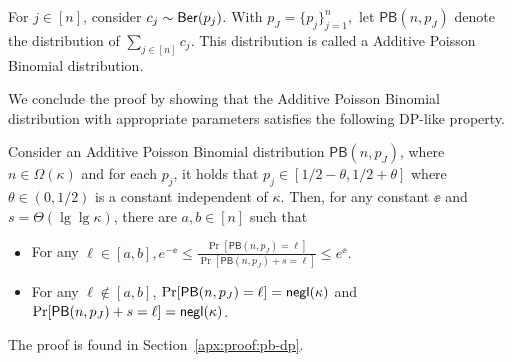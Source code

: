 \newcommand{\PB}{\mathsf{PB}}
For $j \in [n]$, consider  $c_j \sim \mathsf{Ber}(p_j)$.
With $p_J = \{p_j\}_{j=1}^n,$
let $\PB(n, p_J)$ denote the distribution of $\sum_{j \in [n]} c_j$. This
distribution is called a Additive Poisson Binomial distribution. 

We conclude the proof by showing that the Additive Poisson Binomial distribution
with appropriate parameters satisfies the following DP-like property.  

\begin{lemma} \label{lem:pb-dp}
Consider an Additive Poisson Binomial distribution $\PB(n, p_J)$, where $n \in
\Omega(\kappa)$ and for each $p_j$, it holds that  $p_j \in [1/2 - \theta, 1/2 + \theta]$ where $\theta
\in (0, 1/2)$ is a constant independent of $\kappa$. Then, for any constant $\ee$ and $s  = \Theta(\lg\lg \kappa)$, 
there are $a, b \in [n]$ such that
\begin{itemize}
    \item For any $\ell \in [a,b], e^{-\ee} \le \frac{\Pr[\PB(n, p_J) =
    \ell]}{\Pr[\PB(n, p_J)+s = \ell]} \le e^{\ee}.$ 
    \item For any $\ell \not \in [a,b]$, $\Pr[\PB(n,p_J) = \ell] =
    \negl(\kappa)$ and $\Pr[\PB(n,p_J)+s = \ell] = \negl(\kappa)$.
\end{itemize}
\end{lemma}

The proof is found in Section~\ref{apx:proof:pb-dp}.

